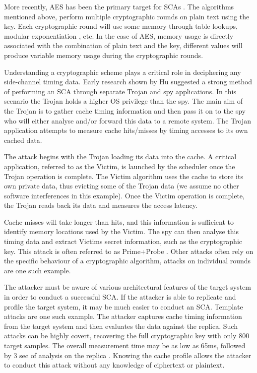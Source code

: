 		More recently, AES has been the primary target for SCAs \cite{Bernstein05,Percival05,Osvik06,Bonneau06_0,Bonneau06_1}. The algorithms mentioned above, perform multiple cryptographic rounds on plain text using the key. Each cryptographic round will use some memory through table lookups, modular exponentiation \cite{Kocher96}, etc. In the case of AES, memory usage is directly associated with the combination of plain text and the key, different values will produce variable memory usage during the cryptographic rounds. 
	
		Understanding a cryptographic scheme plays a critical role in deciphering any side-channel timing data. Early research shown by Hu \cite{Hu92} suggested a strong method of performing an SCA through separate Trojan and spy applications. In this scenario the Trojan holds a higher OS privilege than the spy. The main aim of the Trojan is to gather cache timing information and then pass it on to the spy who will either analyse and/or forward this data to a remote system. The Trojan application attempts to measure cache hits/misses by timing accesses to its own cached data. 
		
		The attack begins with the Trojan loading its data into the cache. A critical application, referred to as the Victim, is launched by the scheduler once the Trojan operation is complete. The Victim algorithm uses the cache to store its own private data, thus evicting some of the Trojan data (we assume no other software interferences in this example). Once the Victim operation is complete, the Trojan reads back its data and measures the access latency. 
		
		Cache misses will take longer than hits, and this information is sufficient to identify memory locations used by the Victim. The spy can then analyse this timing data and extract Victims secret information, such as the cryptographic key. This attack is often referred to as Prime+Probe \cite{Osvik06}. Other attacks often rely on the specific behaviour of a cryptographic algorithm, attacks on individual rounds are one such example.
		
		The attacker must be aware of various architectural features of the target system in order to conduct a successful SCA. If the attacker is able to replicate and profile the target system, it may be much easier to conduct an SCA. Template attacks are one such example. The attacker captures cache timing information from the target system and then evaluates the data against the replica. Such attacks can be highly covert, recovering the full cryptographic key with only 800 target samples. The overall measurement time may be as low as 65ms, followed by 3 sec of analysis on the replica \cite{Brumley09,Osvik06}. Knowing the cache profile allows the attacker to conduct this attack without any knowledge of ciphertext or plaintext. 
		
